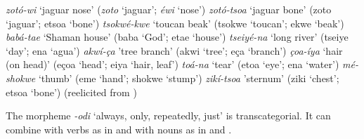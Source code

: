 \documentclass[output=paper,hidelinks]{langscibook}
\begin{document}
\ea \label{ex:compoundlist}
 \begin{xlist}
\ex \textit{zotó-wi} `jaguar nose' (\textit{zoto} `jaguar'; \textit{éwi} `nose')
\ex \textit{zotó-tsoa} `jaguar bone' (zoto `jaguar'; etsoa `bone')
\ex \textit{tsokwé-kwe} `toucan beak' (tsokwe `toucan'; ekwe `beak')
\ex \textit{babá-tae} `Shaman house' (baba `God'; etae `house') 
\ex \textit{tseiyé-na} `long river' (tseiye `day'; ena `agua')  
\ex \textit{akwí-ça} 'tree branch' (akwi `tree';  eça `branch')
\ex \textit{çoa-íya} `hair (on head)' (eçoa `head'; eiya `hair, leaf') 
\ex \textit{toá-na} `tear' (etoa `eye'; ena `water')
\ex \textit{mé-shokwe} `thumb' (eme `hand'; shokwe `stump')
\ex \textit{zikí-tsoa}   'sternum'   (ziki `chest'; etsoa `bone') \hfill (reelicited from \citealt[223]{pitman:1980:araonasketch})
\end{xlist}
\z




The morpheme \textit{-odi} `always, only, repeatedly, just' is transcategorial. It can combine with verbs as in  and with nouns as in  and .
\end{document}
